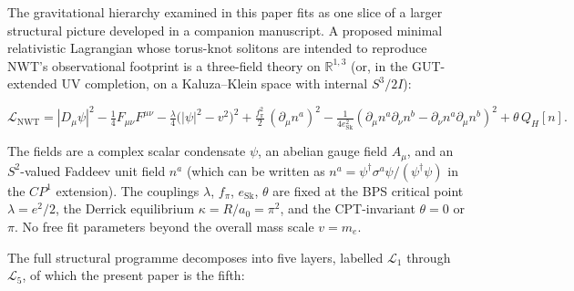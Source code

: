 \documentclass[11pt]{article}
\begin{document}
The gravitational hierarchy examined in this paper fits as one
slice of a larger structural picture developed in a companion
manuscript.  A proposed minimal relativistic Lagrangian whose
torus-knot solitons are intended to reproduce NWT's observational
footprint is a three-field theory on $\mathbb{R}^{1,3}$ (or, in
the GUT-extended UV completion, on a Kaluza--Klein space with
internal $S^3/2I$):

\begin{equation}
\label{eq:LNWT}
\mathcal{L}_\text{NWT}
  =  |D_\mu \psi|^2  -  \tfrac{1}{4} F_{\mu\nu} F^{\mu\nu}
  -  \tfrac{\lambda}{4}\bigl(|\psi|^2 - v^2\bigr)^2
  +  \tfrac{f_\pi^2}{2}\,(\partial_\mu n^a)^2
  -  \tfrac{1}{4 e_\text{Sk}^2}
     (\partial_\mu n^a \partial_\nu n^b - \partial_\nu n^a
        \partial_\mu n^b)^2
  +  \theta\,Q_H[n] .
\end{equation}

The fields are a complex scalar condensate $\psi$, an abelian
gauge field $A_\mu$, and an $S^2$-valued Faddeev unit field
$n^a$ (which can be written as $n^a = \psi^\dagger \sigma^a
\psi/(\psi^\dagger \psi)$ in the $CP^1$ extension).  The
couplings $\lambda$, $f_\pi$, $e_\text{Sk}$, $\theta$ are fixed
at the BPS critical point $\lambda = e^2/2$, the Derrick
equilibrium $\kappa = R/a_0 = \pi^2$, and the CPT-invariant
$\theta = 0$ or $\pi$.  No free fit parameters beyond the
overall mass scale $v = m_e$.

The full structural programme decomposes into five layers,
labelled $\mathcal{L}_1$ through $\mathcal{L}_5$, of which the
present paper is the fifth:
\end{document}
